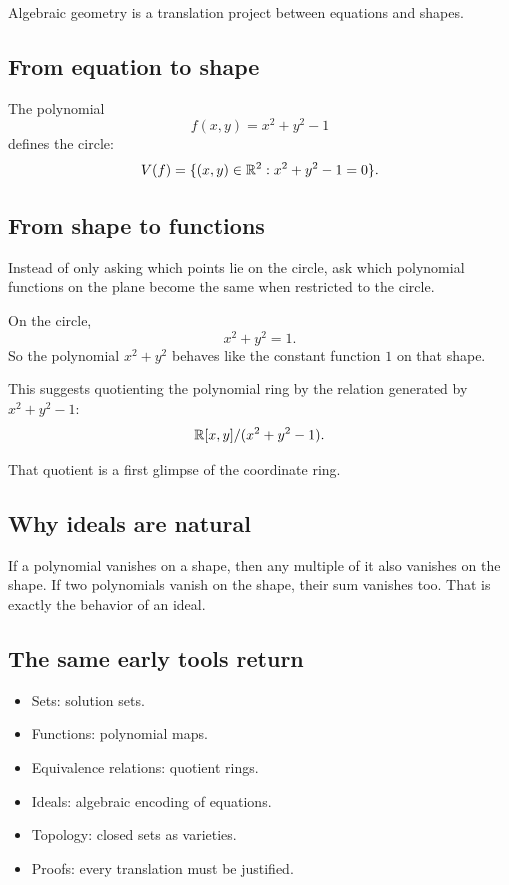 \documentclass[12pt]{article}
\begin{document}
Algebraic geometry is a translation project between equations and shapes.

\subsection{From equation to shape}

The polynomial
\[
f(x,y)=x^2+y^2-1
\]
defines the circle:
\[
V(f)=\{(x,y)\in\mathbb{R}^2:x^2+y^2-1=0\}.
\]

\subsection{From shape to functions}

Instead of only asking which points lie on the circle, ask which polynomial functions on the plane become the same when restricted to the circle.

On the circle,
\[
x^2+y^2=1.
\]
So the polynomial $x^2+y^2$ behaves like the constant function $1$ on that shape.

This suggests quotienting the polynomial ring by the relation generated by $x^2+y^2-1$:
\[
\mathbb{R}[x,y]/(x^2+y^2-1).
\]

That quotient is a first glimpse of the coordinate ring.

\subsection{Why ideals are natural}

If a polynomial vanishes on a shape, then any multiple of it also vanishes on the shape. If two polynomials vanish on the shape, their sum vanishes too. That is exactly the behavior of an ideal.

\subsection{The same early tools return}

\begin{itemize}
\item Sets: solution sets.
\item Functions: polynomial maps.
\item Equivalence relations: quotient rings.
\item Ideals: algebraic encoding of equations.
\item Topology: closed sets as varieties.
\item Proofs: every translation must be justified.
\end{itemize}
\end{document}
